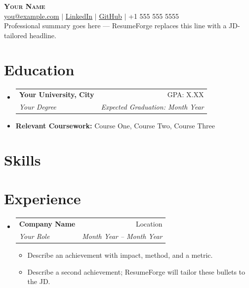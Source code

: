 \documentclass[letterpaper,10pt]{article}
\makeatletter
\newcommand{\resumeItem}[1]{
  \item{\small\setlength{\baselineskip}{10pt} #1 \vspace{-2pt}}
}
\newcommand{\resumeSubheading}[4]{
  \vspace{-2pt}\item
    \begin{tabular*}{\textwidth}[t]{@{}p{0.75\textwidth}@{\extracolsep{\fill}}r@{}}
      \textbf{#1} & \small #2 \\
      \textit{\small#3} & \textit{\small #4} \\
    \end{tabular*}\vspace{-4pt}
}
\newcommand{\resumeSubHeadingListStart}{\begin{itemize}[leftmargin=0in, label={}, topsep=0pt, partopsep=0pt]}
\newcommand{\resumeSubHeadingListEnd}{\end{itemize}}
\newcommand{\resumeItemListStart}{\begin{itemize}[leftmargin=0.15in, label={$\bullet$}, topsep=0pt, partopsep=0pt, itemsep=3pt, parsep=0pt]}
\newcommand{\resumeItemListEnd}{\end{itemize}}
\makeatother
\begin{document}
\fontsize{10.5}{11}\selectfont
\begin{center}
    {\Huge \scshape \textbf{Your Name}} \\ \vspace{4pt}
    \href{mailto:you@example.com}{\ul{you@example.com}} $|$
    \href{https://www.linkedin.com/in/your-handle/}{\ul{LinkedIn}} $|$
    \href{https://github.com/your-handle}{\ul{GitHub}} $|$
    +1 555 555 5555
    \\ \vspace{6pt}
    {Professional summary goes here — ResumeForge replaces this line with a JD-tailored headline.}
\end{center}
\section{Education}
\resumeSubHeadingListStart
  \resumeSubheading
    {Your University, City}{GPA: X.XX}
    {Your Degree}{\textit{Expected Graduation: Month Year}}  \vspace{-9pt}
  \item \small{\textbf{Relevant Coursework:} Course One, Course Two, Course Three}
\resumeSubHeadingListEnd
\section{Skills}
\begin{itemize}[leftmargin=0in, label={}, topsep=0pt, partopsep=0pt]
  \small{\item{
  }}
\end{itemize}
\section{Experience}
\resumeSubHeadingListStart
  \resumeSubheading
    {Company Name}{Location}
    {Your Role}{Month Year -- Month Year}
    \resumeItemListStart
      \resumeItem{Describe an achievement with impact, method, and a metric.}
      \resumeItem{Describe a second achievement; ResumeForge will tailor these bullets to the JD.}
    \resumeItemListEnd
\resumeSubHeadingListEnd
\end{document}
